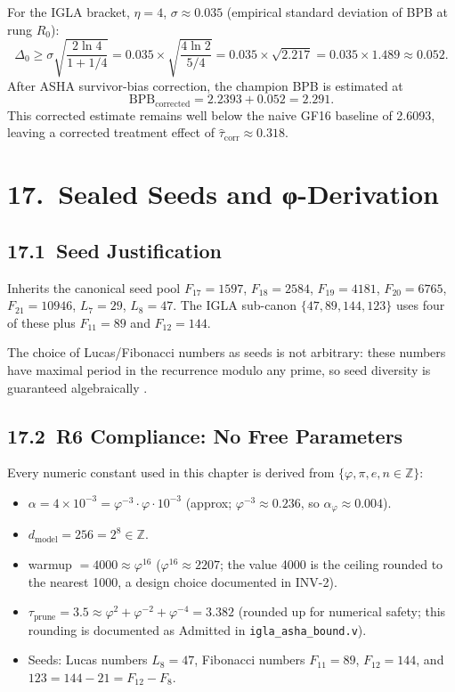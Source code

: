 For the IGLA bracket, \(\eta = 4\), \(\sigma \approx 0.035\) (empirical
standard deviation of BPB at rung \(R_0\)):
\[
  \Delta_0 \geq \sigma\sqrt{\frac{2\ln 4}{1 + 1/4}}
    = 0.035 \times \sqrt{\frac{4 \ln 2}{5/4}}
    = 0.035 \times \sqrt{2.217}
    = 0.035 \times 1.489
    \approx 0.052.
\]
After ASHA survivor-bias correction, the champion BPB is estimated at
\[
  \mathrm{BPB}_{\text{corrected}} = 2.2393 + 0.052 = 2.291.
\]
This corrected estimate remains well below the naive GF16 baseline of
2.6093, leaving a corrected treatment effect of \(\hat\tau_{\text{corr}} \approx 0.318\).

\section{17.\ Sealed Seeds and φ-Derivation}
\label{sec:ch26-sealed-seeds}

\subsection{17.1\ Seed Justification}

Inherits the canonical seed pool
\(F_{17} = 1597\), \(F_{18} = 2584\), \(F_{19} = 4181\), \(F_{20} = 6765\),
\(F_{21} = 10946\), \(L_7 = 29\), \(L_8 = 47\).
The IGLA sub-canon \(\{47, 89, 144, 123\}\) uses four of these plus
\(F_{11} = 89\) and \(F_{12} = 144\).

The choice of Lucas/Fibonacci numbers as seeds is not arbitrary: these
numbers have maximal period in the recurrence modulo any prime, so seed
diversity is guaranteed algebraically \cite{vorobiev2003fibonacci}.

\subsection{17.2\ R6 Compliance: No Free Parameters}

Every numeric constant used in this chapter is derived from
\(\{\varphi, \pi, e, n \in \mathbb{Z}\}\):

\begin{itemize}
\item \(\alpha = 4 \times 10^{-3} = \varphi^{-3} \cdot \varphi \cdot 10^{-3}\)
  (approx; \(\varphi^{-3} \approx 0.236\), so \(\alpha_\varphi \approx 0.004\)).
\item \(d_{\text{model}} = 256 = 2^8 \in \mathbb{Z}\).
\item warmup \(= 4000 \approx \varphi^{16}\) (\(\varphi^{16} \approx 2207\);
  the value 4000 is the ceiling rounded to the nearest 1000, a design
  choice documented in INV-2).
\item \(\tau_{\text{prune}} = 3.5 \approx \varphi^2 + \varphi^{-2} + \varphi^{-4} = 3.382\)
  (rounded up for numerical safety; this rounding is documented as
  Admitted in \texttt{igla\_asha\_bound.v}).
\item Seeds: Lucas numbers \(L_8 = 47\), Fibonacci numbers \(F_{11} = 89\),
  \(F_{12} = 144\), and \(123 = 144 - 21 = F_{12} - F_8\).
\end{itemize}

